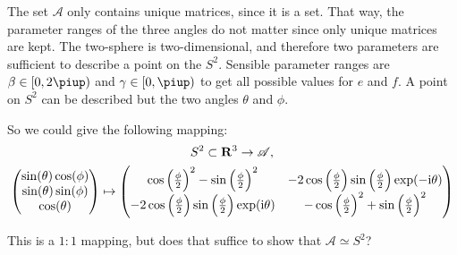 \documentclass[11pt, english, fleqn, DIV=15, headinclude, BCOR=1cm]{scrartcl}
\begin{document}
The set $\mathscr A$ only contains unique matrices, since it is a set. That
way, the parameter ranges of the three angles do not matter since only unique
matrices are kept. The two-sphere is two-dimensional, and therefore two
parameters are sufficient to describe a point on the $S^2$. Sensible parameter
ranges are $\beta \in [0, 2\piup)$ and $\gamma \in [0, \piup)$ to get all
possible values for $e$ and $f$. A point on $S^2$ can be described but the two
angles $\theta$ and $\phi$.

So we could give the following mapping:
\begin{gather*}
    S^2 \subset \mathbf R^3 \to \mathscr A, \\
    \begin{pmatrix}
        \sin(\theta) \cos(\phi) \\
        \sin(\theta) \sin(\phi) \\
        \cos(\theta)
    \end{pmatrix}
    \mapsto
    \begin{pmatrix}
        \cos\left( \frac\phi2 \right)^2 - \sin\left( \frac\phi2 \right)^2 &
        - 2 \cos\left( \frac\phi2 \right)\sin\left( \frac\phi2 \right)\exp(-\mathrm i \theta) \\
        -2 \cos\left( \frac\phi2 \right)\sin\left( \frac\phi2 \right)\exp(\mathrm i\theta) &
        - \cos\left( \frac\phi2 \right)^2 + \sin\left( \frac\phi2 \right)^2
    \end{pmatrix}
\end{gather*}

This is a $1:1$ mapping, but does that suffice to show that $\mathscr A \simeq
S^2$?
\end{document}
